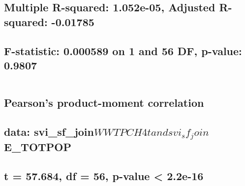 \documentclass[
  12pt,
]{article}
\begin{document}
\hypertarget{multiple-r-squared-1.052e-05-adjusted-r-squared--0.01785}{%
\subsection{Multiple R-squared: 1.052e-05, Adjusted R-squared:
-0.01785}\label{multiple-r-squared-1.052e-05-adjusted-r-squared--0.01785}}

\hypertarget{f-statistic-0.000589-on-1-and-56-df-p-value-0.9807}{%
\subsection{F-statistic: 0.000589 on 1 and 56 DF, p-value:
0.9807}\label{f-statistic-0.000589-on-1-and-56-df-p-value-0.9807}}

\begin{verbatim}
\end{verbatim}

\hypertarget{section-30}{%
\subsection{}\label{section-30}}

\hypertarget{pearsons-product-moment-correlation-3}{%
\subsection{Pearson's product-moment
correlation}\label{pearsons-product-moment-correlation-3}}

\hypertarget{section-31}{%
\subsection{}\label{section-31}}

\hypertarget{data-svi_sf_joinwwtpch4t-and-svi_sf_joine_totpop}{%
\subsection{\texorpdfstring{data:
svi\_sf\_join\(WWTPCH4t and svi_sf_join\)E\_TOTPOP}{data: svi\_sf\_joinWWTPCH4t and svi\_sf\_joinE\_TOTPOP}}\label{data-svi_sf_joinwwtpch4t-and-svi_sf_joine_totpop}}

\hypertarget{t-57.684-df-56-p-value-2.2e-16}{%
\subsection{t = 57.684, df = 56, p-value \textless{}
2.2e-16}\label{t-57.684-df-56-p-value-2.2e-16}}
\end{document}
